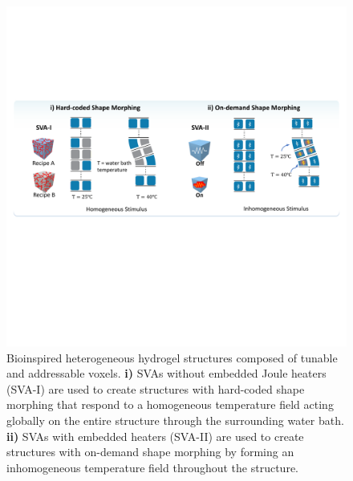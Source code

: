 \begin{figure}[!ht]
\centering
\includegraphics[width=\textwidth]{heterogeneous.pdf}
\caption[Illustration of bioinspired heterogeneous hydrogel structures]{Bioinspired heterogeneous hydrogel structures composed of tunable and addressable voxels. \textbf{i)} SVAs without embedded Joule heaters (SVA-I) are used to create structures with hard-coded shape morphing that respond to a homogeneous temperature field acting globally on the entire structure through the surrounding water bath. \textbf{ii)} SVAs with embedded heaters (SVA-II) are used to create structures with on-demand shape morphing by forming an inhomogeneous temperature field throughout the structure.}
\label{fig:heterogeneous}
\end{figure}

